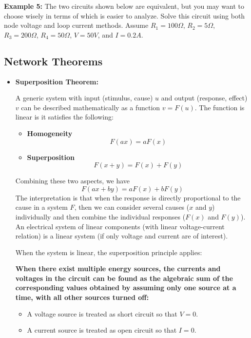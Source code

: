{\bf Example 5:} The two circuits shown below are equivalent, but you may want to
choose wisely in terms of which is easier to analyze. Solve this circuit using
both node voltage and loop current methods. Assume $R_1=100\Omega$, $R_2=5\Omega$, 
$R_3=200\Omega$, $R_4=50\Omega$, $V=50V$, and $I=0.2A$.

  


\subsection*{Network Theorems}

\begin{itemize}
\item {\bf Superposition Theorem:}

A generic system with input (stimulus, cause) $u$ and output (response,
effect) $v$ can be described mathematically as a function $v=F(u)$. 
The function is linear is it satisfies the following:
\begin{itemize}
\item {\bf Homogeneity}
  \[	F(ax)=aF(x) \]
\item {\bf Superposition}
  \[ F(x+y)=F(x)+F(y)	\]
\end{itemize}
Combining these two aspects, we have
\[	F(ax+by)=aF(x)+bF(y)	\]
The interpretation is that when the response is directly proportional to 
the cause in a system $F$, then we can consider several causes ($x$ and $y$) 
individually and then combine the individual responses ($F(x)$ and $F(y)$). 
An electrical system of linear components (with linear voltage-current 
relation) is a linear system (if only voltage and current are of interest).

When the system is linear, the superposition principle applies:

{\bf When there exist multiple energy sources, the currents and voltages in 
the circuit can be found as the algebraic sum of the corresponding values 
obtained by assuming only one source at a time, with all other sources turned 
off:
\begin{itemize}
\item A voltage source is treated as short circuit so that $V=0$.
\item A current source is treated as open circuit so that $I=0$.
\end{itemize}}


\end{itemize}
